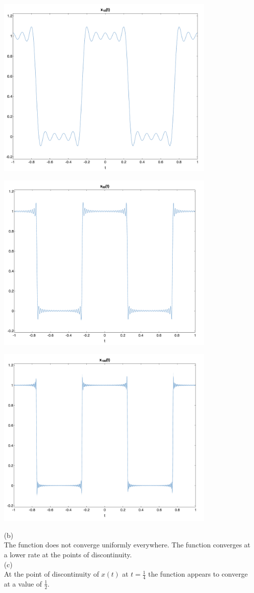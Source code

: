 \documentclass{article}
\begin{document}
\begin{center}
    \includegraphics[width=0.8\textwidth]{x10.png}
\end{center}
\begin{center}
    \includegraphics[width=0.8\textwidth]{x50.png}
\end{center}
\begin{center}
    \includegraphics[width=0.8\textwidth]{x100.png}
\end{center}

(b)\\
The function does not converge uniformly everywhere. The function converges at a lower rate at the points of discontinuity.\\

(c)\\
At the point of discontinuity of $x(t)$ at $t = \frac{1}{4}$ the function appears to converge at a value of $\frac{1}{2}$. 
\end{document}
